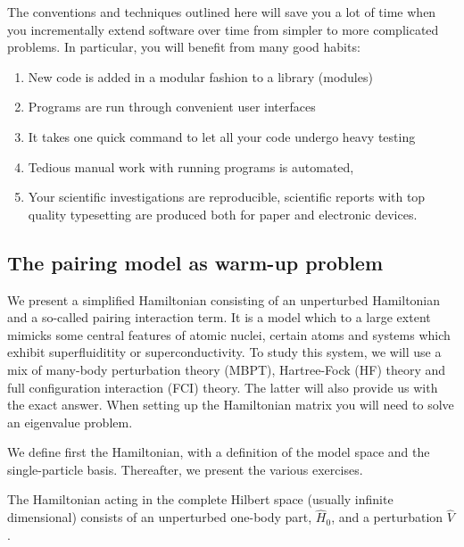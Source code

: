 \documentclass[%
twoside,                 %
final,                   %
10pt]{article}
\begin{document}
\noindent
The conventions and techniques outlined here will save you a lot of time when you incrementally extend software over time from simpler to more complicated problems. In particular, you will benefit from many good habits:
\begin{enumerate}
\item New code is added in a modular fashion to a library (modules)

\item Programs are run through convenient user interfaces

\item It takes one quick command to let all your code undergo heavy testing 

\item Tedious manual work with running programs is automated,

\item Your scientific investigations are reproducible, scientific reports with top quality typesetting are produced both for paper and electronic devices.
\end{enumerate}

\noindent
\subsection*{The pairing model as warm-up problem}

We present a simplified Hamiltonian consisting of an unperturbed
Hamiltonian and a so-called pairing interaction term. It is a model
which to a large extent mimicks some central features of atomic
nuclei, certain atoms and systems which exhibit superfluiditity or
superconductivity.  To study this system, we will use a mix of
many-body perturbation theory (MBPT), Hartree-Fock (HF) theory and full
configuration interaction (FCI) theory. The latter will also provide us with
the exact answer.  When setting up the Hamiltonian matrix you will
need to solve an eigenvalue problem.

We define first the Hamiltonian, with a definition of the model space
and the single-particle basis. Thereafter, we present the various
exercises.


The Hamiltonian acting in the complete Hilbert space (usually infinite
dimensional) consists of an unperturbed one-body part, $\hat{H}_0$,
and a perturbation $\hat{V}$.
\end{document}
